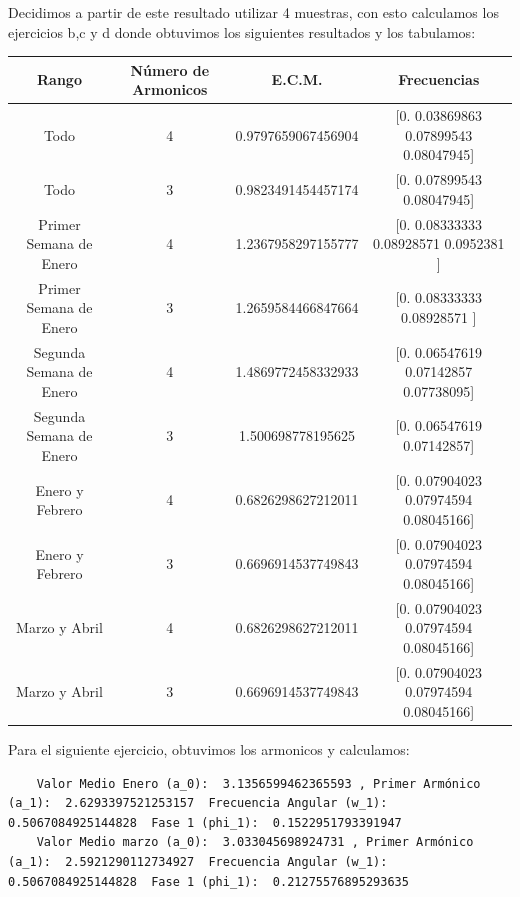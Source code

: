 \documentclass[10pt,a4paper]{article}
\numberwithin{equation}{section}
\numberwithin{figure}{section}
\numberwithin{table}{section}
\begin{document}
Decidimos a partir de este resultado utilizar 4 muestras, con esto calculamos los ejercicios b,c y d donde obtuvimos los siguientes resultados y los tabulamos:

\begin{center}
    \begin{tabular}{||c|c|c|c||} 
    \hline
    Rango & Número de Armonicos & E.C.M. & Frecuencias \\ [0.5ex] 
    \hline\hline
    Todo & 4 & 0.9797659067456904 &  [0.         0.03869863 0.07899543 0.08047945] \\ 
    \hline
    Todo & 3 &  0.9823491454457174 & [0.         0.07899543 0.08047945] \\
    \hline
    Primer Semana de Enero & 4 & 1.2367958297155777 & [0.         0.08333333 0.08928571 0.0952381 ] \\
    \hline
    Primer Semana de Enero & 3 &  1.2659584466847664 & [0.         0.08333333 0.08928571 ] \\
    \hline
    Segunda Semana de Enero & 4 &  1.4869772458332933 & [0.         0.06547619 0.07142857 0.07738095]  \\
    \hline
    Segunda Semana de Enero & 3 & 1.500698778195625  &  [0.         0.06547619 0.07142857] \\
    \hline
    Enero y Febrero & 4  & 0.6826298627212011 & [0.         0.07904023 0.07974594 0.08045166] \\
    \hline
    Enero y Febrero & 3  & 0.6696914537749843 &  [0.         0.07904023 0.07974594 0.08045166]\\
    \hline
    Marzo y Abril & 4  & 0.6826298627212011 &[0.         0.07904023 0.07974594 0.08045166] \\
    \hline
    Marzo y Abril & 3  &  0.6696914537749843&[0.         0.07904023 0.07974594 0.08045166] \\
    \hline
   \end{tabular}
   \end{center}

   Para el siguiente ejercicio, obtuvimos los armonicos y calculamos:

\begin{verbatim}
    Valor Medio Enero (a_0):  3.1356599462365593 , Primer Armónico (a_1):  2.6293397521253157  Frecuencia Angular (w_1):  0.5067084925144828  Fase 1 (phi_1):  0.1522951793391947
    Valor Medio marzo (a_0):  3.033045698924731 , Primer Armónico (a_1):  2.5921290112734927  Frecuencia Angular (w_1):  0.5067084925144828  Fase 1 (phi_1):  0.21275576895293635 
\end{verbatim}
\end{document}
